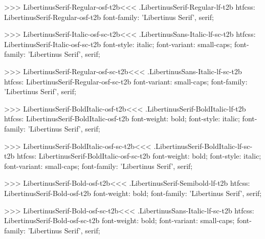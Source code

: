 {{{{{{{{{{>>>
\<LibertinusSerif-Regular-osf-t2b\><<<
.LibertinusSerif-Regular-lf-t2b
htfcss:  LibertinusSerif-Regular-osf-t2b  font-family: 'Libertinus Serif', serif;

>>>
\<LibertinusSerif-Italic-osf-sc-t2b\><<<
.LibertinusSans-Italic-lf-sc-t2b
htfcss:  LibertinusSerif-Italic-osf-sc-t2b  font-style: italic; font-variant: small-caps; font-family: 'Libertinus Serif', serif;

>>>
\<LibertinusSerif-Regular-osf-sc-t2b\><<<
.LibertinusSans-Italic-lf-sc-t2b
htfcss:  LibertinusSerif-Regular-osf-sc-t2b  font-variant: small-caps; font-family: 'Libertinus Serif', serif;

>>>
\<LibertinusSerif-BoldItalic-osf-t2b\><<<
.LibertinusSerif-BoldItalic-lf-t2b
htfcss:  LibertinusSerif-BoldItalic-osf-t2b  font-weight: bold; font-style: italic; font-family: 'Libertinus Serif', serif;

>>>
\<LibertinusSerif-BoldItalic-osf-sc-t2b\><<<
.LibertinusSerif-BoldItalic-lf-sc-t2b
htfcss:  LibertinusSerif-BoldItalic-osf-sc-t2b  font-weight: bold; font-style: italic; font-variant: small-caps; font-family: 'Libertinus Serif', serif;

>>>
\<LibertinusSerif-Bold-osf-t2b\><<<
.LibertinusSerif-Semibold-lf-t2b
htfcss:  LibertinusSerif-Bold-osf-t2b  font-weight: bold; font-family: 'Libertinus Serif', serif;

>>>
\<LibertinusSerif-Bold-osf-sc-t2b\><<<
.LibertinusSans-Italic-lf-sc-t2b
htfcss:  LibertinusSerif-Bold-osf-sc-t2b  font-weight: bold; font-variant: small-caps; font-family: 'Libertinus Serif', serif;

}}}}}}}}}}
